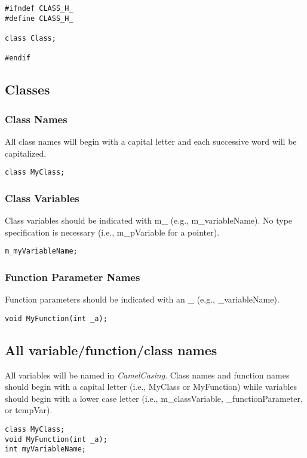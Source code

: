 \documentclass[12pt]{article}
\begin{document}
\begin{lstlisting}
#ifndef CLASS_H_
#define CLASS_H_

class Class;

#endif
\end{lstlisting}

\subsection{Classes}
\subsubsection{Class Names}
All class names will begin with a capital letter and each successive word will be capitalized.

\begin{lstlisting}
class MyClass;
\end{lstlisting}

\subsubsection{Class Variables}
Class variables should be indicated with m\_ (e.g., m\_variableName). No type specification is necessary (i.e.,
m\_pVariable for a pointer).

\begin{lstlisting}
m_myVariableName;
\end{lstlisting}

\subsubsection{Function Parameter Names}
Function parameters should be indicated with an \_ (e.g., \_variableName).

\begin{lstlisting}
void MyFunction(int _a);
\end{lstlisting}

\subsection{All variable/function/class names}
All variables will be named in \emph{CamelCasing}. Class names and function names should begin with a capital letter (i.e.,
MyClass or MyFunction) while variables should begin with a lower case letter (i.e., m\_classVariable,
\_functionParameter, or tempVar).

\begin{lstlisting}
class MyClass;
void MyFunction(int _a);
int myVariableName;
\end{lstlisting}
\end{document}
